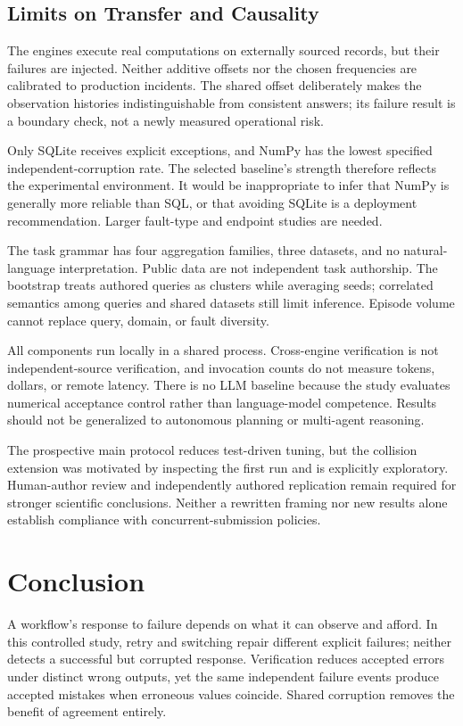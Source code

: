 \documentclass{svproc}
\begin{document}
\subsection{Limits on Transfer and Causality}
The engines execute real computations on externally sourced records, but their failures are injected. Neither additive offsets nor the chosen frequencies are calibrated to production incidents. The shared offset deliberately makes the observation histories indistinguishable from consistent answers; its failure result is a boundary check, not a newly measured operational risk.

Only SQLite receives explicit exceptions, and NumPy has the lowest specified independent-corruption rate. The selected baseline's strength therefore reflects the experimental environment. It would be inappropriate to infer that NumPy is generally more reliable than SQL, or that avoiding SQLite is a deployment recommendation. Larger fault-type and endpoint studies are needed.

The task grammar has four aggregation families, three datasets, and no natural-language interpretation. Public data are not independent task authorship. The bootstrap treats authored queries as clusters while averaging seeds; correlated semantics among queries and shared datasets still limit inference. Episode volume cannot replace query, domain, or fault diversity.

All components run locally in a shared process. Cross-engine verification is not independent-source verification, and invocation counts do not measure tokens, dollars, or remote latency. There is no LLM baseline because the study evaluates numerical acceptance control rather than language-model competence. Results should not be generalized to autonomous planning or multi-agent reasoning.

The prospective main protocol reduces test-driven tuning, but the collision extension was motivated by inspecting the first run and is explicitly exploratory. Human-author review and independently authored replication remain required for stronger scientific conclusions. Neither a rewritten framing nor new results alone establish compliance with concurrent-submission policies.

\section{Conclusion}
A workflow's response to failure depends on what it can observe and afford. In this controlled study, retry and switching repair different explicit failures; neither detects a successful but corrupted response. Verification reduces accepted errors under distinct wrong outputs, yet the same independent failure events produce accepted mistakes when erroneous values coincide. Shared corruption removes the benefit of agreement entirely.
\end{document}
